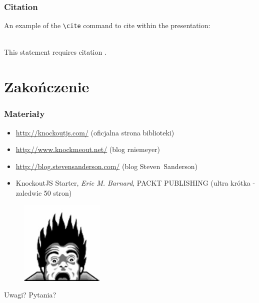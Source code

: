 \documentclass{beamer}
\begin{document}
\begin{frame}[fragile] %
\frametitle{Citation}
An example of the \verb|\cite| command to cite within the presentation:\\~

This statement requires citation \cite{p1}.
\end{frame}


\section{Zakończenie}

\begin{frame}
	\frametitle{Materiały}
	\begin{itemize}
		\item
			\url{http://knockoutjs.com/} (oficjalna strona biblioteki)
		\item
			\url{http://www.knockmeout.net/} (blog rniemeyer)
		\item
			\url{http://blog.stevensanderson.com/} (blog Steven~Sanderson)
		\item
			KnockoutJS Starter, \textit{Eric M. Barnard}, PACKT PUBLISHING 
			(ultra krótka - zaledwie 50 stron)
	\end{itemize}
\end{frame}


\begin{frame}
	\begin{figure}
		\centering
		\includegraphics[width=4cm]{img/coding_horror}
	\end{figure}
	\Huge{\centerline{Uwagi? Pytania?}}
\end{frame}

\end{document}
